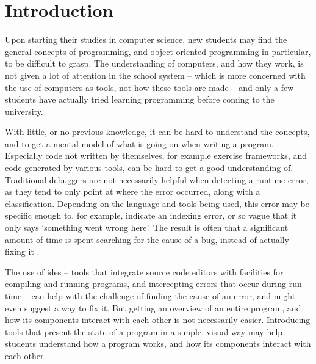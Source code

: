 \chapter{Introduction}\label{introduction}

Upon starting their studies in computer science, new students may find the general concepts of programming, and object oriented programming in particular, to be difficult to grasp.
The understanding of computers, and how they work, is not given a lot of attention in the school system -- which is more concerned with the use of computers as tools, not how these tools are made -- and only a few students have actually tried learning programming before coming to the university. %

With little, or no previous knowledge, it can be hard to understand the concepts, and to get a mental model of what is going on when writing a program.
Especially code not written by themselves, for example exercise frameworks, and code generated by various tools, can be hard to get a good understanding of.
Traditional debuggers are not necessarily helpful when detecting a runtime error, as they tend to only point at where the error occurred, along with a classification.
Depending on the language and tools being used, this error may be specific enough to, for example, indicate an indexing error, or so vague that it only says `something went wrong here'.
The result is often that a significant amount of time is spent searching for the cause of a bug, instead of actually fixing it \cite{ko2006}. %

The use of \glspl{ide} -- tools that integrate source code editors with facilities for compiling and running programs, and intercepting errors that occur during run-time -- can help with the challenge of finding the cause of an error, and might even suggest a way to fix it.
But getting an overview of an entire program, and how its components interact with each other is not necessarily easier.
Introducing tools that present the state of a program in a simple, visual way may help students understand how a program works, and how its components interact with each other.

